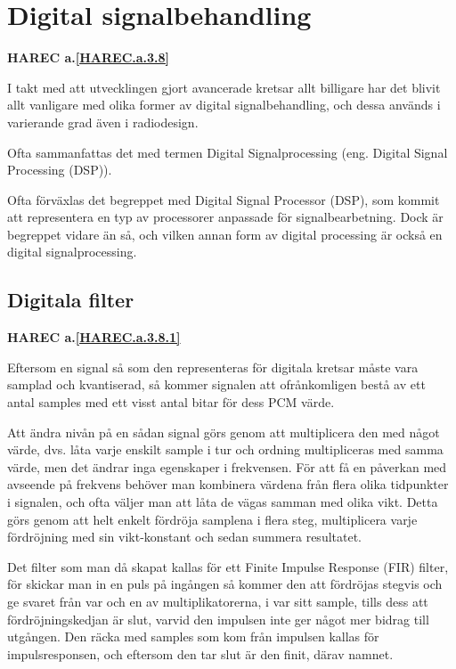 \section{Digital signalbehandling}
\textbf{HAREC a.\ref{HAREC.a.3.8}\label{myHAREC.a.3.8}}

I takt med att utvecklingen gjort avancerade kretsar allt billigare har det
blivit allt vanligare med olika former av digital signalbehandling, och dessa
används i varierande grad även i radiodesign.

Ofta sammanfattas det med termen Digital Signalprocessing (eng. Digital
Signal Processing (DSP)).

Ofta förväxlas det begreppet med Digital Signal Processor (DSP), som kommit att
representera en typ av processorer anpassade för signalbearbetning.
Dock är begreppet vidare än så, och vilken annan form av digital processing är
också en digital signalprocessing.

\subsection{Digitala filter}
\textbf{HAREC a.\ref{HAREC.a.3.8.1}\label{myHAREC.a.3.8.1}}
\label{digitala filter}

Eftersom en signal så som den representeras för digitala kretsar måste vara
samplad och kvantiserad, så kommer signalen att ofrånkomligen bestå av ett
antal samples med ett visst antal bitar för dess PCM värde.

Att ändra nivån på en sådan signal görs genom att multiplicera den med något
värde, dvs. låta varje enskilt sample i tur och ordning multipliceras med
samma värde, men det ändrar inga egenskaper i frekvensen.
För att få en påverkan med avseende på frekvens behöver man kombinera värdena
från flera olika tidpunkter i signalen, och ofta väljer man att låta de
vägas samman med olika vikt.
Detta görs genom att helt enkelt fördröja samplena i flera steg,
multiplicera varje fördröjning med sin vikt-konstant och sedan summera
resultatet.

Det filter som man då skapat kallas för ett Finite Impulse Response (FIR)
filter, för skickar man in en puls på ingången så kommer den att fördröjas
stegvis och ge svaret från var och en av multiplikatorerna, i var sitt sample,
tills dess att fördröjningskedjan är slut, varvid den impulsen inte ger något
mer bidrag till utgången.
Den räcka med samples som kom från impulsen kallas för impulsresponsen, och
eftersom den tar slut är den finit, därav namnet.

